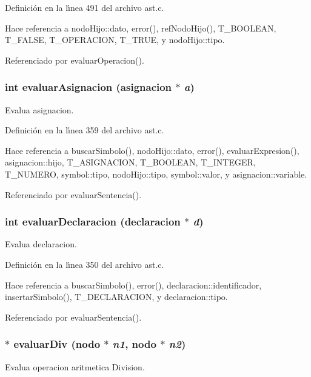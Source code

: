 Definici\'{o}n en la l\'{\i}nea 491 del archivo ast.c.

Hace referencia a nodo\-Hijo::dato, error(), ref\-Nodo\-Hijo(), T\_\-BOOLEAN, T\_\-FALSE, T\_\-OPERACION, T\_\-TRUE, y nodo\-Hijo::tipo.

Referenciado por evaluar\-Operacion().
\subsubsection{\setlength{\rightskip}{0pt plus 5cm}int evaluar\-Asignacion ({\bf asignacion} $\ast$ {\em a})}\label{ast_8h_a39}


Evalua asignacion. 



Definici\'{o}n en la l\'{\i}nea 359 del archivo ast.c.

Hace referencia a buscar\-Simbolo(), nodo\-Hijo::dato, error(), evaluar\-Expresion(), asignacion::hijo, T\_\-ASIGNACION, T\_\-BOOLEAN, T\_\-INTEGER, T\_\-NUMERO, symbol::tipo, nodo\-Hijo::tipo, symbol::valor, y asignacion::variable.

Referenciado por evaluar\-Sentencia().
\subsubsection{\setlength{\rightskip}{0pt plus 5cm}int evaluar\-Declaracion ({\bf declaracion} $\ast$ {\em d})}\label{ast_8h_a38}


Evalua declaracion. 



Definici\'{o}n en la l\'{\i}nea 350 del archivo ast.c.

Hace referencia a buscar\-Simbolo(), error(), declaracion::identificador, insertar\-Simbolo(), T\_\-DECLARACION, y declaracion::tipo.

Referenciado por evaluar\-Sentencia().
\subsubsection{$\ast$ evaluar\-Div ({\bf nodo} $\ast$ {\em n1}, {\bf nodo} $\ast$ {\em n2})}\label{ast_8h_a53}


Evalua operacion aritmetica Division. 



